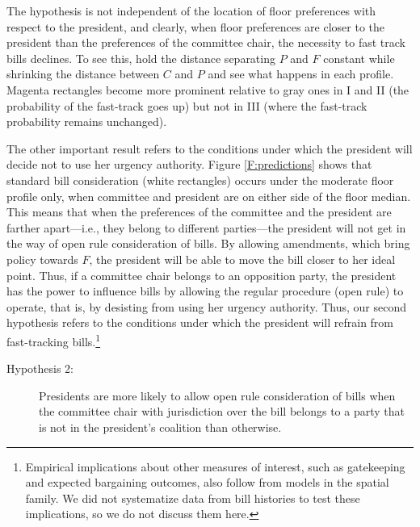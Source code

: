 \documentclass[letter,12pt]{article}
\begin{document}

The hypothesis is not independent of the location of floor preferences with respect to the president, and clearly, when floor preferences are closer to the president than the preferences of the committee chair, the necessity to fast track bills declines. To see this, hold the distance separating $P$ and $F$ constant while shrinking the distance between $C$ and $P$ and see what happens in each profile. Magenta rectangles become more prominent relative to gray ones in I and II (the probability of the fast-track goes up) but not in III (where the fast-track probability remains unchanged). 

The other important result refers to the conditions under which the president will decide not to use her urgency authority.  Figure \ref{F:predictions} shows that standard bill consideration (white rectangles) occurs under the moderate floor profile only, when committee and president are on either side of the floor median. This means that when the preferences of the committee and the president are farther apart---i.e., they belong to different parties---the president will not get in the way of open rule consideration of bills. By allowing amendments, which bring policy towards $F$, the president will be able to move the bill closer to her ideal point. Thus, if a committee chair belongs to an opposition party, the president has the power to influence bills by allowing the regular procedure (open rule) to operate, that is, by desisting from using her urgency authority. Thus, our second hypothesis refers to the conditions under which the president will refrain from fast-tracking bills.\footnote{Empirical implications about other measures of interest, such as gatekeeping and expected bargaining outcomes, also follow from models in the spatial family. We did not systematize data from bill histories to test these implications, so we do not discuss them here.} 

\begin{description}
  \item [Hypothesis 2:] Presidents are more likely to allow open rule consideration of bills when the committee chair with jurisdiction over the bill belongs to a party that is not in the president's coalition than otherwise.
\end{description}
\end{document}
